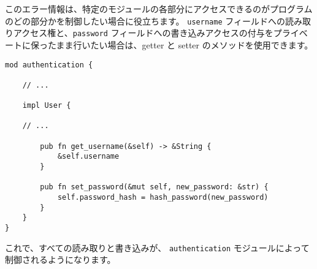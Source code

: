 このエラー情報は、特定のモジュールの各部分にアクセスできるのがプログラムのどの部分かを制御したい場合に役立ちます。 \texttt{username} フィールドへの読み取りアクセス権と、\texttt{password} フィールドへの書き込みアクセスの付与をプライベートに保ったまま行いたい場合は、getter と setter のメソッドを使用できます。

\begin{lstlisting}[numbers=none]
mod authentication {

    // ...

    impl User {

    // ...

        pub fn get_username(&self) -> &String {
            &self.username
        }
    
        pub fn set_password(&mut self, new_password: &str) {
            self.password_hash = hash_password(new_password)
        }
    }
}
\end{lstlisting}

これで、すべての読み取りと書き込みが、 \texttt{authentication} モジュールによって制御されるようになります。

